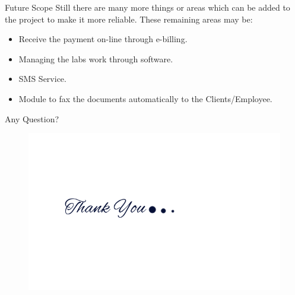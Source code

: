 \watermarkon
\begin{frame}[t,fragile]{Future Scope}
Still there are many more things or areas which can
be added to the project to make it more reliable. These remaining areas may be:
\begin{itemize}
\item Receive the payment on-line through e-billing.
\item Managing the labs work through software.
\item SMS Service.
\item Module to fax the documents automatically to the Clients/Employee. 

\end{itemize}
\end{frame}
\watermarkoff
\begin{frame}[t,fragile]{Any Question?}
\begin{figure}
\includegraphics[height=0.7\paperheight]{thank}
\end{figure}
\end{frame}




